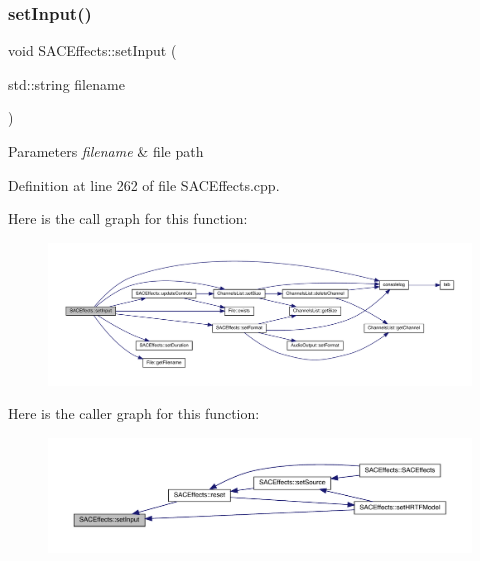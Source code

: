 \subsubsection{\texorpdfstring{set\+Input()}{setInput()}}
{\footnotesize\ttfamily void S\+A\+C\+Effects\+::set\+Input (\begin{DoxyParamCaption}\item[{std\+::string}]{filename }\end{DoxyParamCaption})}


\begin{DoxyParams}{Parameters}
{\em filename} & file path \\
\hline
\end{DoxyParams}


Definition at line 262 of file S\+A\+C\+Effects.\+cpp.

Here is the call graph for this function\+:
\nopagebreak
\begin{figure}[H]
\begin{center}
\leavevmode
\includegraphics[width=350pt]{class_s_a_c_effects_a5292df44aee2a4ec49c99e3136b5472e_cgraph}
\end{center}
\end{figure}
Here is the caller graph for this function\+:
\nopagebreak
\begin{figure}[H]
\begin{center}
\leavevmode
\includegraphics[width=350pt]{class_s_a_c_effects_a5292df44aee2a4ec49c99e3136b5472e_icgraph}
\end{center}
\end{figure}
\mbox{\label{class_s_a_c_effects_aaa9092eb132a8fe2b0560b3a600747b5}} 
